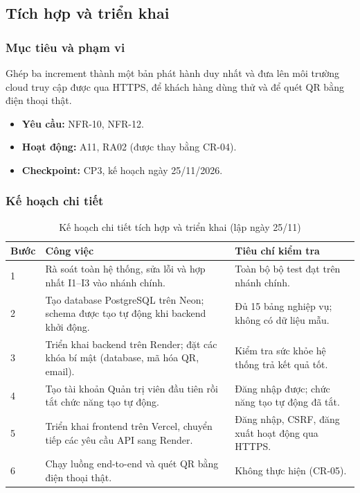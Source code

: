 \subsection{Tích hợp và triển khai}
\label{sec:t3-deploy}

\subsubsection{Mục tiêu và phạm vi}

Ghép ba increment thành một bản phát hành duy nhất và đưa lên môi trường cloud truy cập được qua HTTPS, để khách hàng dùng thử và để quét QR bằng điện thoại thật.

\begin{itemize}
    \item \textbf{Yêu cầu:} NFR-10, NFR-12.
    \item \textbf{Hoạt động:} A11, RA02 (được thay bằng CR-04).
    \item \textbf{Checkpoint:} CP3, kế hoạch ngày 25/11/2026.
\end{itemize}

\subsubsection{Kế hoạch chi tiết}

\begin{table}[H]
\centering\small
\caption{Kế hoạch chi tiết tích hợp và triển khai (lập ngày 25/11)}\label{tab:t3-lower-deploy}
\begin{tabularx}{\linewidth}{@{}p{.05\linewidth}Xp{.32\linewidth}@{}}
\toprule
\textbf{Bước} & \textbf{Công việc} & \textbf{Tiêu chí kiểm tra}\\\midrule
1 & Rà soát toàn hệ thống, sửa lỗi và hợp nhất I1--I3 vào nhánh chính. & Toàn bộ bộ test đạt trên nhánh chính.\\
2 & Tạo database PostgreSQL trên Neon; schema được tạo tự động khi backend khởi động. & Đủ 15 bảng nghiệp vụ; không có dữ liệu mẫu.\\
3 & Triển khai backend trên Render; đặt các khóa bí mật (database, mã hóa QR, email). & Kiểm tra sức khỏe hệ thống trả kết quả tốt.\\
4 & Tạo tài khoản Quản trị viên đầu tiên rồi tắt chức năng tạo tự động. & Đăng nhập được; chức năng tạo tự động đã tắt.\\
5 & Triển khai frontend trên Vercel, chuyển tiếp các yêu cầu API sang Render. & Đăng nhập, CSRF, đăng xuất hoạt động qua HTTPS.\\
6 & Chạy luồng end-to-end và quét QR bằng điện thoại thật. & Không thực hiện (CR-05).\\
\bottomrule
\end{tabularx}
\end{table}

